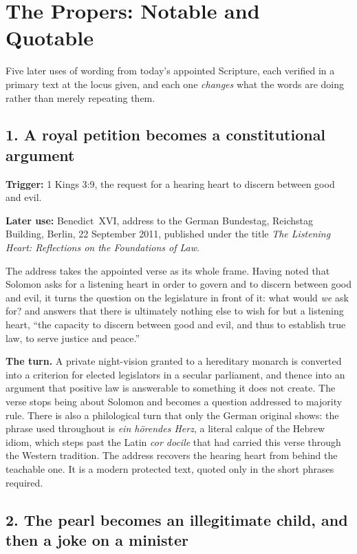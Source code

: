 \section*{The Propers: Notable and Quotable}

Five later uses of wording from today's appointed Scripture, each verified in a primary text at the locus given, and each one \emph{changes} what the words are doing rather than merely repeating them.

\subsection*{1. A royal petition becomes a constitutional argument}

\textbf{Trigger:} 1 Kings 3:9, the request for a hearing heart to discern between good and evil.\par\noindent
\textbf{Later use:} Benedict~XVI, address to the German Bundestag, Reichstag Building, Berlin, 22 September 2011, published under the title \emph{The Listening Heart: Reflections on the Foundations of Law}.

The address takes the appointed verse as its whole frame. Having noted that Solomon asks for a listening heart in order to govern and to discern between good and evil, it turns the question on the legislature in front of it: what would \emph{we} ask for? and answers that there is ultimately nothing else to wish for but a listening heart, ``the capacity to discern between good and evil, and thus to establish true law, to serve justice and peace.''

\textbf{The turn.} A private night-vision granted to a hereditary monarch is converted into a criterion for elected legislators in a secular parliament, and thence into an argument that positive law is answerable to something it does not create. The verse stops being about Solomon and becomes a question addressed to majority rule. There is also a philological turn that only the German original shows: the phrase used throughout is \emph{ein hörendes Herz}, a literal calque of the Hebrew idiom, which steps past the Latin \emph{cor docile} that had carried this verse through the Western tradition. The address recovers the hearing heart from behind the teachable one. It is a modern protected text, quoted only in the short phrases required.

\subsection*{2. The pearl becomes an illegitimate child, and then a joke on a minister}

